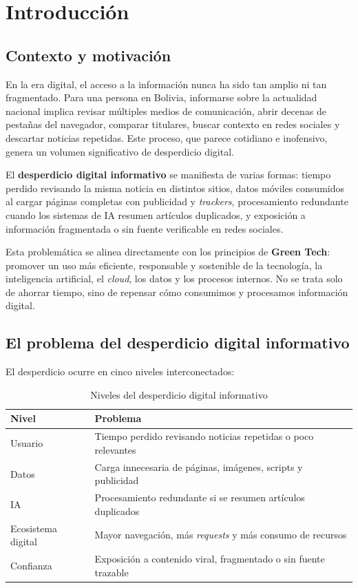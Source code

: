 \chapter{Introducci\'on}

\section{Contexto y motivaci\'on}

En la era digital, el acceso a la informaci\'on nunca ha sido tan amplio ni tan fragmentado. Para una persona en Bolivia, informarse sobre la actualidad nacional implica revisar m\'ultiples medios de comunicaci\'on, abrir decenas de pesta\~nas del navegador, comparar titulares, buscar contexto en redes sociales y descartar noticias repetidas. Este proceso, que parece cotidiano e inofensivo, genera un volumen significativo de desperdicio digital.

El \textbf{desperdicio digital informativo} se manifiesta de varias formas: tiempo perdido revisando la misma noticia en distintos sitios, datos m\'oviles consumidos al cargar p\'aginas completas con publicidad y \textit{trackers}, procesamiento redundante cuando los sistemas de IA resumen art\'iculos duplicados, y exposici\'on a informaci\'on fragmentada o sin fuente verificable en redes sociales.

Esta problem\'atica se alinea directamente con los principios de \textbf{Green Tech}: promover un uso m\'as eficiente, responsable y sostenible de la tecnolog\'ia, la inteligencia artificial, el \textit{cloud}, los datos y los procesos internos. No se trata solo de ahorrar tiempo, sino de repensar c\'omo consumimos y procesamos informaci\'on digital.

\section{El problema del desperdicio digital informativo}

El desperdicio ocurre en cinco niveles interconectados:

\begin{table}[H]
\centering
\begin{tabular}{lp{10cm}}
\toprule
\textbf{Nivel} & \textbf{Problema} \\
\midrule
Usuario & Tiempo perdido revisando noticias repetidas o poco relevantes \\
Datos & Carga innecesaria de p\'aginas, im\'agenes, scripts y publicidad \\
IA & Procesamiento redundante si se resumen art\'iculos duplicados \\
Ecosistema digital & Mayor navegaci\'on, m\'as \textit{requests} y m\'as consumo de recursos \\
Confianza & Exposici\'on a contenido viral, fragmentado o sin fuente trazable \\
\bottomrule
\end{tabular}
\caption{Niveles del desperdicio digital informativo}
\end{table}

